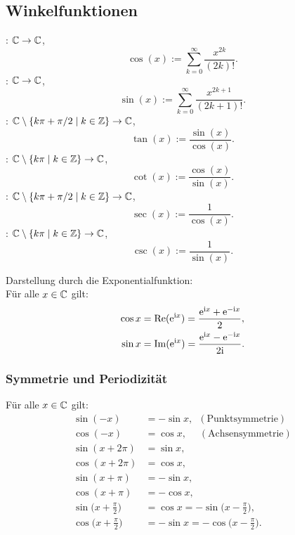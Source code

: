 \subsection{Winkelfunktionen}
\begin{Definition} : $\mathbb C\to\mathbb C$,
\begin{equation}
\cos(x) := \sum_{k=0}^\infty \frac{x^{2k}}{(2k)!}.
\end{equation}
: $\mathbb C\to\mathbb C$,
\begin{equation}
\sin(x) := \sum_{k=0}^\infty \frac{x^{2k+1}}{(2k+1)!}.
\end{equation}
: $\mathbb C\setminus\{k\pi+\pi/2\mid k\in\mathbb Z\}\to\mathbb C$,
\begin{equation}
\tan(x) := \frac{\sin(x)}{\cos(x)}.
\end{equation}
: $\mathbb C\setminus\{k\pi\mid k\in\mathbb Z\}\to\mathbb C$,
\begin{equation}
\cot(x) := \frac{\cos(x)}{\sin(x)}.
\end{equation}
: $\mathbb C\setminus\{k\pi+\pi/2\mid k\in\mathbb Z\}\to\mathbb C$,
\begin{equation}
\sec(x) := \frac{1}{\cos(x)}.
\end{equation}
: $\mathbb C\setminus\{k\pi\mid k\in\mathbb Z\}\to\mathbb C$,
\begin{equation}
\csc(x) := \frac{1}{\sin(x)}.
\end{equation}
\end{Definition}
\noindent
Darstellung durch die Exponentialfunktion:\\
Für alle $x\in\mathbb C$ gilt:
\begin{align}
\cos x &= \operatorname*{Re}(\mathrm e^{\mathrm i x}) = \frac{\mathrm e^{\mathrm i x}+\mathrm e^{-\mathrm i x}}{2},\\
\sin x &= \operatorname*{Im}(\mathrm e^{\mathrm i x}) = \frac{\mathrm e^{\mathrm i x}-\mathrm e^{-\mathrm i x}}{2\mathrm i}.
\end{align}

\subsubsection{Symmetrie und Periodizität}
Für alle $x\in\mathbb C$ gilt:
\begin{align}
\sin(-x) &= -\sin x,\enspace(\text{Punktsymmetrie})\\
\cos(-x) &= \cos x,\quad\;(\text{Achsensymmetrie})\\
\sin(x+2\pi) &= \sin x,\\
\cos(x+2\pi) &= \cos x,\\
\sin(x+\pi)  &=-\sin x,\\
\cos(x+\pi)  &=-\cos x,\\
\sin\Big(x+\frac{\pi}{2}\Big) &= \cos x = -\sin\Big(x-\frac{\pi}{2}\Big),\\
\cos\Big(x+\frac{\pi}{2}\Big) &= -\sin x = -\cos\Big(x-\frac{\pi}{2}\Big).
\end{align}

